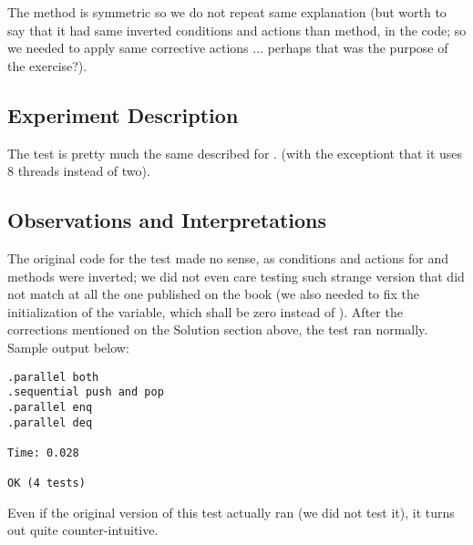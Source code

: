 The  method is symmetric so we do not repeat same explanation
(but worth to say that it had same inverted conditions and actions
than  method, in the code; so we needed to apply same
corrective actions ... perhaps that was the purpose of the exercise?).

\subsection{Experiment Description}
The test is pretty much the same described for .
(with the exceptiont that it uses 8 threads instead of two).

\subsection{Observations and Interpretations}
The original code for the test made no sense, as conditions and
actions for  and  methods were inverted; we did not even
care testing such strange version that did not match at all the one
published on the book (we also needed to fix the initialization of the
 variable, which shall be zero instead of ). After
the corrections mentioned on the Solution section above, the test ran
normally. Sample output below: 

\begin{verbatim}
.parallel both
.sequential push and pop
.parallel enq
.parallel deq

Time: 0.028

OK (4 tests)
\end{verbatim}
\hfill

Even if the original version of this test actually ran (we did not
test it), it turns out quite counter-intuitive.

